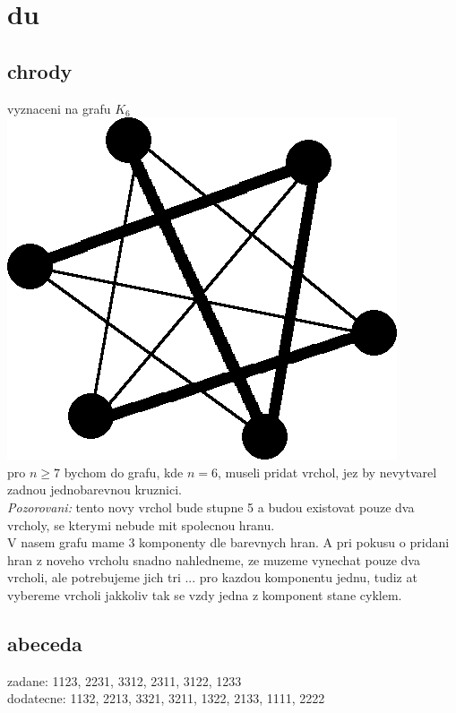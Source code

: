 \documentclass[a4paper]{article}
\begin{document}
\pagestyle{fancy}

\setcounter{section}{3}
\section{du}
\subsection{chrody}
vyznaceni na grafu $K_6$\\
\includegraphics[width=.3\textwidth]{chords.png}\\
pro $n\geq7$ bychom do grafu, kde $n=6$, museli pridat vrchol,
jez by nevytvarel zadnou jednobarevnou kruznici.\\
\textit{Pozorovani:} tento novy vrchol bude stupne 5
a budou existovat pouze dva vrcholy,
se kterymi nebude mit spolecnou hranu.\\
V nasem grafu mame 3 komponenty dle barevnych hran.
A pri pokusu o pridani hran z noveho vrcholu snadno nahledneme,
ze muzeme vynechat pouze dva vrcholi, ale potrebujeme jich tri ... 
pro kazdou komponentu jednu, tudiz at vybereme vrcholi jakkoliv tak
se vzdy jedna z komponent stane cyklem.


\subsection{}


\subsection{abeceda}
zadane:     1123, 2231, 3312, 2311, 3122, 1233\\
dodatecne:  1132, 2213, 3321, 3211, 1322, 2133, 1111, 2222
\end{document}
